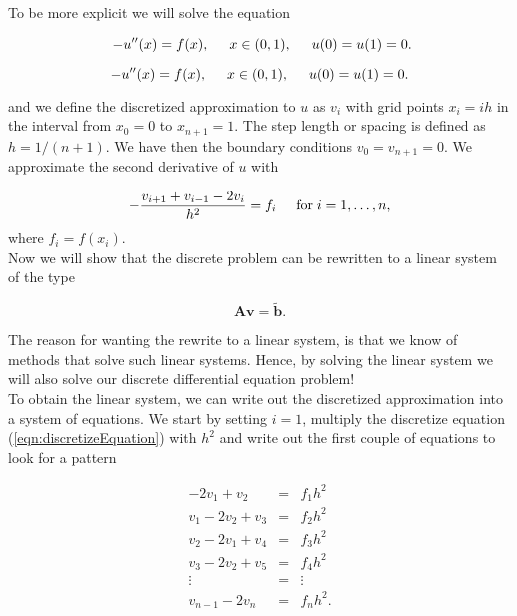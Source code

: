 \documentclass{article}
\begin{document}
To be more explicit we will solve the equation

\begin{equation}\
-u''(x) = f(x), \hspace{0.5cm} x\in(0,1), \hspace{0.5cm} u(0) = u(1) = 0.
\end{equation}

\begin{equation}
-u''(x) = f(x), \hspace{0.5cm} x\in(0,1), \hspace{0.5cm} u(0) = u(1) = 0.
\label{eqn:diffEquation}
\end{equation}

and we define the discretized approximation  to $u$ as $v_i$  with 
grid points $x_i=ih$   in the interval from $x_0=0$ to $x_{n+1}=1$.
The step length or spacing is defined as $h=1/(n+1)$. 
We have then the boundary conditions $v_0 = v_{n+1} = 0$.
We  approximate the second
derivative of $u$ with

\begin{equation}
-\frac{v_{i+1}+v_{i-1}-2v_i}{h^2} = f_i  \hspace{0.5cm} \mathrm{for} \hspace{0.1cm} i=1,\dots, n,
\label{eqn:discretizeEquation}
\end{equation}
where $f_i=f(x_i)$. \\

Now we will show that the discrete problem can be rewritten to a linear system of the type 

\begin{equation*}
\mathbf{A}\mathbf{v} = \tilde{\mathbf{b}}.
\end{equation*}

The reason for wanting the rewrite to a linear system, is that we know of methods that solve such linear systems. Hence, by solving the linear system we will also solve our discrete differential equation problem!\\

To obtain the linear system, we can write out the discretized approximation into a system of equations. We start by setting $i=1$, multiply the discretize equation (\ref{eqn:discretizeEquation}) with $h^2$ and write out the first couple of equations to look for a pattern

\begin{eqnarray}
\nonumber
-2v_1 + v_2 &=& f_1h^2 \\ \nonumber
v_1 - 2v_2 +v_3 &=& f_2h^2 \\ \nonumber
v_2 - 2v_1 +v_4 &=& f_3h^2 \\ \nonumber
v_3 - 2v_2 +v_5 &=& f_4h^2 \\ \nonumber
\vdots &=& \vdots \\ \nonumber
v_{n-1} - 2v_n &=& f_nh^2. \\ \nonumber
\end{eqnarray}
\end{document}
